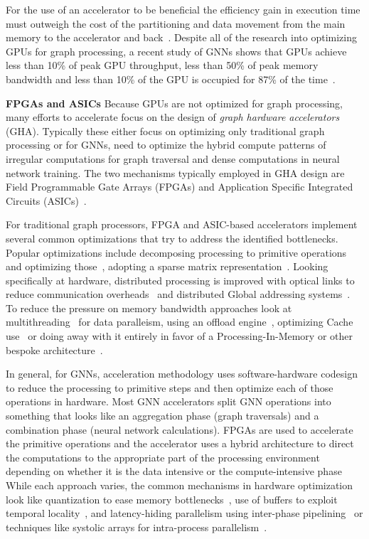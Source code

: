 For the use of an accelerator to be beneficial the efficiency gain in execution time must outweigh the cost of the partitioning and data movement from the main memory to the accelerator and back~\cite{Azad2021}.
Despite all of the research into optimizing GPUs for graph processing, a recent study of GNNs shows that GPUs achieve less than 10\% of peak GPU throughput, less than 50\% of peak memory bandwidth and less than 10\% of the GPU is occupied for 87\% of the time~\cite{Huang2021}.

\textbf{FPGAs and ASICs}
Because GPUs are not optimized for graph processing, many efforts to accelerate \gai focus on the design of \textit{graph hardware accelerators} (GHA). 
Typically these either focus on optimizing only traditional graph processing or for GNNs, need to optimize the hybrid compute patterns of irregular computations for graph traversal and dense computations in neural network training.
The two mechanisms typically employed in GHA design are Field Programmable Gate Arrays (FPGAs) and Application Specific Integrated Circuits (ASICs)~\cite{Zhang2023}.

For traditional graph processors, FPGA and ASIC-based accelerators implement several common optimizations that try to address the identified bottlenecks. 
Popular optimizations include decomposing processing to primitive operations and optimizing those~\cite{Dadu2021, Chen2020}, adopting a sparse matrix representation~\cite{Song2016, Ham2016, Sundaram2015}.
Looking specifically at hardware, distributed processing is improved with optical links to reduce communication overheads~\cite{Song2016, Aananthakrishnan2020} and distributed Global addressing systems~\cite{Dysart2016, Aananthakrishnan2020}.
To reduce the pressure on memory bandwidth approaches look at multithreading~\cite{Aananthakrishnan2020} for data paralleism, using an offload engine~\cite{Aananthakrishnan2020}, optimizing Cache use~\cite{Sundaram2015,Dadu2021} or doing away with it entirely in favor of a Processing-In-Memory or other bespoke architecture~\cite{Song2016, Dadu2021, Dysart2016, Aananthakrishnan2020}.

In general, for GNNs, acceleration methodology uses software-hardware codesign to reduce the processing to primitive steps and then optimize each of those operations in hardware. 
Most GNN accelerators split GNN operations into something that looks like an aggregation phase (graph traversals) and a combination phase (neural network calculations).
FPGAs are used to accelerate the primitive operations and the accelerator uses a hybrid architecture to direct the computations to the appropriate part of the processing environment depending on whether it is the data intensive or the compute-intensive phase~\cite{Kiningham2022, Zhang2023, Yan2020, Lin2023, Zhang2023b, Lin2024}
While each approach varies, the common mechanisms in hardware optimization look like quantization to ease memory bottlenecks~\cite{Zhu2023, Zhong2023}, use of buffers to exploit temporal locality~\cite{Chen2022, Zhang2023a, Chen2023, Zhong2023}, and latency-hiding parallelism using inter-phase pipelining~\cite{Kiningham2022} or techniques like systolic arrays for intra-process parallelism~\cite{Yan2020}.

